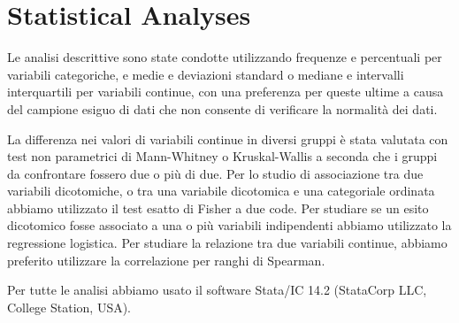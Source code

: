 \section{Statistical Analyses}\label{sec:statisticalanalyses}
Le analisi descrittive sono state condotte utilizzando frequenze e percentuali per variabili categoriche, e medie e deviazioni standard o mediane e intervalli interquartili per variabili continue, con una preferenza per queste ultime a causa del campione esiguo di dati che non consente di verificare la normalità dei dati.

La differenza nei valori di variabili continue in diversi gruppi è stata valutata con test non parametrici di Mann-Whitney o Kruskal-Wallis a seconda che i gruppi da confrontare fossero due o più di due. Per lo studio di associazione tra due variabili dicotomiche, o tra una variabile dicotomica e una categoriale ordinata abbiamo utilizzato il test esatto di Fisher a due code. Per studiare se un esito dicotomico fosse associato a una o più variabili indipendenti abbiamo utilizzato la regressione logistica.
Per studiare la relazione tra due variabili continue, abbiamo preferito utilizzare la correlazione per ranghi di Spearman.

Per tutte le analisi abbiamo usato il software Stata/IC 14.2 (StataCorp LLC, College Station, USA).


